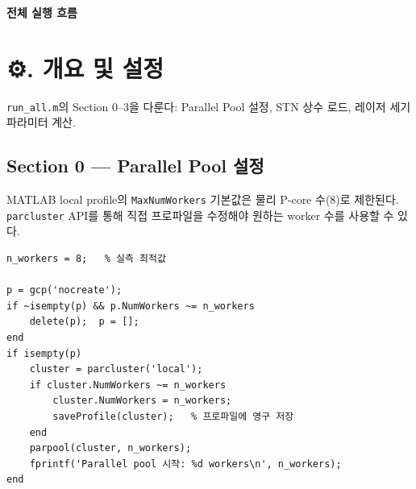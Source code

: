 \documentclass[11pt, a4paper]{article}
\newcommand{\emo}[1]{{\emojifont #1}}
\begin{document}
{\color{nh1}\large\bfseries 전체 실행 흐름}
\vspace{0.8em}

\begin{center}
\end{center}

\newpage

\section{\emo{⚙️}. 개요 및 설정}

\begin{callout}[📌]
\texttt{run\_all.m}의 Section 0--3을 다룬다: Parallel Pool 설정, STN 상수 로드,
레이저 세기 파라미터 계산.
\end{callout}

\subsection{Section 0 — Parallel Pool 설정}

MATLAB local profile의 \texttt{MaxNumWorkers} 기본값은 물리 P-core 수(8)로 제한된다.
\texttt{parcluster} API를 통해 직접 프로파일을 수정해야 원하는 worker 수를 사용할 수 있다.

\begin{lstlisting}
n_workers = 8;   % 실측 최적값

p = gcp('nocreate');
if ~isempty(p) && p.NumWorkers ~= n_workers
    delete(p);  p = [];
end
if isempty(p)
    cluster = parcluster('local');
    if cluster.NumWorkers ~= n_workers
        cluster.NumWorkers = n_workers;
        saveProfile(cluster);   % 프로파일에 영구 저장
    end
    parpool(cluster, n_workers);
    fprintf('Parallel pool 시작: %d workers\n', n_workers);
end
\end{lstlisting}
\end{document}
